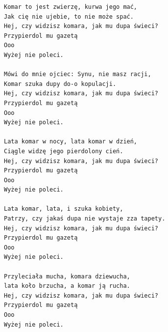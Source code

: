 \documentclass[12pt]{article}
\begin{document}
\begin{verbatim}
Komar to jest zwierzę, kurwa jego mać,
Jak cię nie ujebie, to nie może spać.
Hej, czy widzisz komara, jak mu dupa świeci?
Przypierdol mu gazetą
Ooo
Wyżej nie poleci.

Mówi do mnie ojciec: Synu, nie masz racji,
Komar szuka dupy do-o kopulacji.
Hej, czy widzisz komara, jak mu dupa świeci?
Przypierdol mu gazetą
Ooo
Wyżej nie poleci.

Lata komar w nocy, lata komar w dzień,
Ciągle widzę jego pierdolony cień.
Hej, czy widzisz komara, jak mu dupa świeci?
Przypierdol mu gazetą
Ooo
Wyżej nie poleci.

Lata komar, lata, i szuka kobiety,
Patrzy, czy jakaś dupa nie wystaje zza tapety.
Hej, czy widzisz komara, jak mu dupa świeci?
Przypierdol mu gazetą
Ooo
Wyżej nie poleci.

Przyleciała mucha, komara dziewucha,
lata koło brzucha, a komar ją rucha.
Hej, czy widzisz komara, jak mu dupa świeci?
Przypierdol mu gazetą
Ooo
Wyżej nie poleci.
\end{verbatim}
\clearpage
\end{document}
